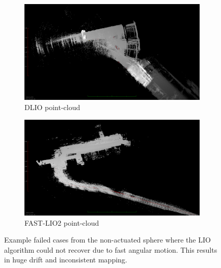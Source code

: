 \documentclass[a4paper, conference]{IEEEtran}
\begin{document}
\begin{figure}
\centering
\begin{subfigure}{0.49\columnwidth}
    \centering
    \includegraphics[width=\textwidth]{pics/drifts_bending/dlio_drift.png}
    \caption{DLIO point-cloud}\label{fig:dlio_drift}
\end{subfigure}
\begin{subfigure}{0.49\columnwidth}
    \centering
    \includegraphics[width=\textwidth]{pics/drifts_bending/lio_drifts.png}
    \caption{FAST-LIO2 point-cloud}\label{fig:lio_drift}
\end{subfigure}
\caption{Example failed cases from the non-actuated sphere where the LIO algorithm could not recover due to fast angular motion.
This results in huge drift and inconsistent mapping.}\vspace{-3mm}
\label{fig:drift}
\end{figure}
\end{document}
